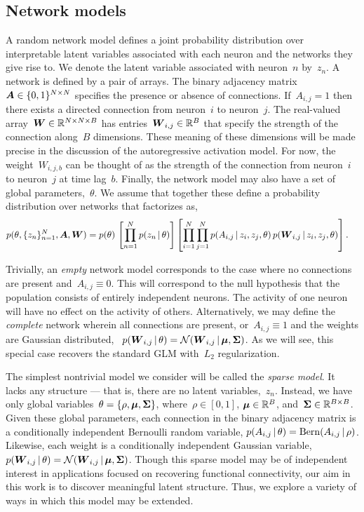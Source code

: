 \subsection{Network models}
A random network model defines a joint probability distribution over interpretable latent variables associated with each neuron and the networks they give rise to. 
We denote the latent variable associated with neuron~$n$ by~$z_n$.  
A network is defined by a pair of arrays. 
The binary adjacency matrix~$\boldsymbol{A} \in \{0,1\}^{N\times N}$ specifies the presence or absence of connections. 
If~$A_{i,j}=1$ then there exists a directed connection from neuron~$i$ to neuron~$j$.
The real-valued array~$\boldsymbol{W} \in \mathbb{R}^{N \times N \times B}$ has entries~$\boldsymbol{W}_{i,j} \in \mathbb{R}^B$ that specify the strength of the connection along~$B$ dimensions.
These meaning of these dimensions will be made precise in the discussion of the autoregressive activation model.
For now, the weight~$W_{i,j,b}$ can be thought of as the strength of the connection from neuron~$i$ to neuron~$j$ at time lag~$b$.
Finally, the network model may also have a set of global parameters,~$\theta$. 
We assume that together these define a probability distribution over networks that factorizes as,
\begin{align}
p(\theta, \{z_n\}_{n=1}^N, \boldsymbol{A}, \boldsymbol{W}) &= 
p(\theta) \, 
\left[ \prod_{n=1}^N p(z_n \,|\, \theta) \right]  
\left[ \prod_{i=1}^N \prod_{j=1}^N p(A_{i,j} \,|\, z_{i}, z_{j}, \theta) \, 
p(\boldsymbol{W}_{i,j} \,|\, z_{i}, z_{j}, \theta) \right].
\end{align}

Trivially, an \emph{empty} network model corresponds to the case where no connections are present and~${A_{i,j} \equiv 0}$. 
This will correspond to the null hypothesis that the population consists of entirely independent neurons. 
The activity of one neuron will have no effect on the activity of others. 
Alternatively, we may define the \emph{complete} network wherein all connections are present, or~${A_{i,j} \equiv 1}$ and the weights are Gaussian distributed,
~${p(\boldsymbol{W}_{i,j} \,|\, \theta) = \mathcal{N}(\boldsymbol{W}_{i,j} \,|\, \boldsymbol{\mu}, \boldsymbol{\Sigma})}$. 
As we will see, this special case recovers the standard GLM with~$L_2$ regularization. 

The simplest nontrivial model we consider will be called the \emph{sparse model}.
It lacks any structure --- that is, there are no latent variables,~$z_n$. 
Instead, we have only global variables~$\theta = \{\rho, \boldsymbol{\mu}, \boldsymbol{\Sigma} \}$, where~${\rho \in [0,1]}$, ${\boldsymbol{\mu} \in \mathbb{R}^B}$, and~${\boldsymbol{\Sigma} \in \mathbb{R}^{B \times B}}$. 
Given these global parameters, each connection in the binary adjacency matrix is a conditionally independent Bernoulli random variable,
${p(A_{i,j} \,|\, \theta) = \mathrm{Bern}(A_{i,j} \,|\, \rho)}$.
Likewise, each weight is a conditionally independent Gaussian variable,
${p(\boldsymbol{W}_{i,j} \,|\, \theta) = \mathcal{N}(\boldsymbol{W}_{i,j} \,|\, \boldsymbol{\mu}, \boldsymbol{\Sigma})}$.
Though this sparse model may be of independent interest in applications focused on recovering functional connectivity, our aim in this work is to discover meaningful latent structure. 
Thus, we explore a variety of ways in which this model may be extended.

